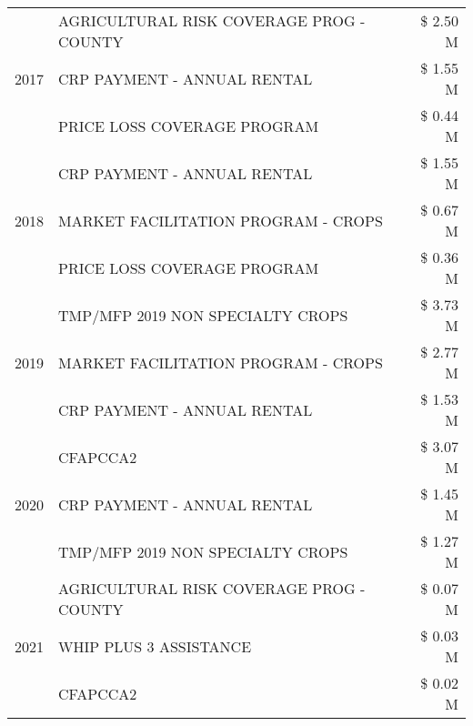 \begin{tabular}{llr}
\cline{1-3}
\multirow[t]{3}{*}{2017} & AGRICULTURAL RISK COVERAGE PROG - COUNTY & \$ 2.50 M \\
 & CRP PAYMENT - ANNUAL RENTAL & \$ 1.55 M \\
 & PRICE LOSS COVERAGE PROGRAM & \$ 0.44 M \\
\cline{1-3}
\multirow[t]{3}{*}{2018} & CRP PAYMENT - ANNUAL RENTAL & \$ 1.55 M \\
 & MARKET FACILITATION PROGRAM - CROPS & \$ 0.67 M \\
 & PRICE LOSS COVERAGE PROGRAM & \$ 0.36 M \\
\cline{1-3}
\multirow[t]{3}{*}{2019} & TMP/MFP 2019 NON SPECIALTY CROPS & \$ 3.73 M \\
 & MARKET FACILITATION PROGRAM - CROPS & \$ 2.77 M \\
 & CRP PAYMENT - ANNUAL RENTAL & \$ 1.53 M \\
\cline{1-3}
\multirow[t]{3}{*}{2020} & CFAPCCA2 & \$ 3.07 M \\
 & CRP PAYMENT - ANNUAL RENTAL & \$ 1.45 M \\
 & TMP/MFP 2019 NON SPECIALTY CROPS & \$ 1.27 M \\
\cline{1-3}
\multirow[t]{3}{*}{2021} & AGRICULTURAL RISK COVERAGE PROG - COUNTY & \$ 0.07 M \\
 & WHIP PLUS 3 ASSISTANCE & \$ 0.03 M \\
 & CFAPCCA2 & \$ 0.02 M \\
\cline{1-3}
\bottomrule
\end{tabular}
